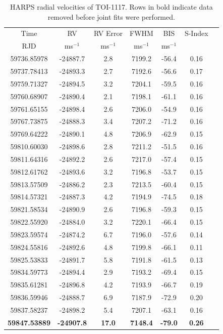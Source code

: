 \documentclass[fleqn,usenatbib,useAMS]{mnras}
\begin{document}
\begin{table}
 \vspace{-1em}
 \caption{HARPS radial velocities of TOI-1117. Rows in bold indicate data removed before joint fits were performed.}
 \vspace{-1em}
 \label{tab:RVs}
  \begin{tabular}[t]{ccccccc}
  \hline
   Time & RV & RV Error & FWHM & BIS & S-Index\\ 
   RJD & ms$^{-1}$ & ms$^{-1}$ & ms$^{-1}$ & ms$^{-1}$ &\\
   \hline
   59736.85978 & -24887.7 & 2.8 & 7199.2 & -56.4 & 0.16\\
   59737.78413 & -24893.3 & 2.7 & 7192.6 & -56.6 & 0.17\\
   59759.71327 & -24894.5 & 3.2 & 7204.1 & -59.5 & 0.16\\
   59760.68907 & -24890.4 & 2.1 & 7198.1 & -61.1 & 0.16\\ 
59761.65155 & -24898.4 & 2.6 & 7206.0 & -54.9 & 0.16\\
59767.73875 & -24888.3 & 3.4 & 7207.2 & -71.2 & 0.16\\ 
59769.64222 & -24890.1 & 4.8 & 7206.9 & -62.9 & 0.15\\
59810.60030 & -24898.6 & 2.8 & 7211.2 & -51.5 & 0.16\\ 
59811.64316 & -24892.2 & 2.6 & 7217.0 & -57.4 & 0.15\\ 
59812.61762 & -24893.6 & 3.2 & 7196.8 & -53.7 & 0.15\\ 
59813.57509 & -24886.2 & 2.3 & 7213.5 & -60.4 & 0.15\\
59814.57321 & -24887.3 & 4.2 & 7194.9 & -74.5 & 0.18\\ 
59821.58534 & -24890.9 & 2.6 & 7196.8 & -59.3 & 0.15\\ 
59822.55920 & -24884.0 & 3.2 & 7220.1 & -66.4 & 0.15\\
59823.59574 & -24874.2 & 6.7 & 7196.0 & -57.6 & 0.14\\ 
59824.55816 & -24892.6 & 4.8 & 7199.8 & -66.1 & 0.11\\ 
59825.53833 & -24891.7 & 5.8 & 7191.8 & -61.5 & 0.13\\ 
59834.59773 & -24894.4 & 2.9 & 7193.2 & -69.4 & 0.15\\ 
59835.61281 & -24896.8 & 4.2 & 7193.9 & -66.7 & 0.19\\
59836.59946 & -24888.7 & 6.9 & 7187.9 & -72.9 & 0.20\\ 
59837.58237 & -24898.2 & 5.4 & 7207.1 & -63.1 & 0.16\\ 
\textbf{59847.53889} & \textbf{-24907.8} & \textbf{17.0} & \textbf{7148.4} & \textbf{-79.0} & \textbf{0.26}\\ 

\end{tabular}
\end{table}
\end{document}

